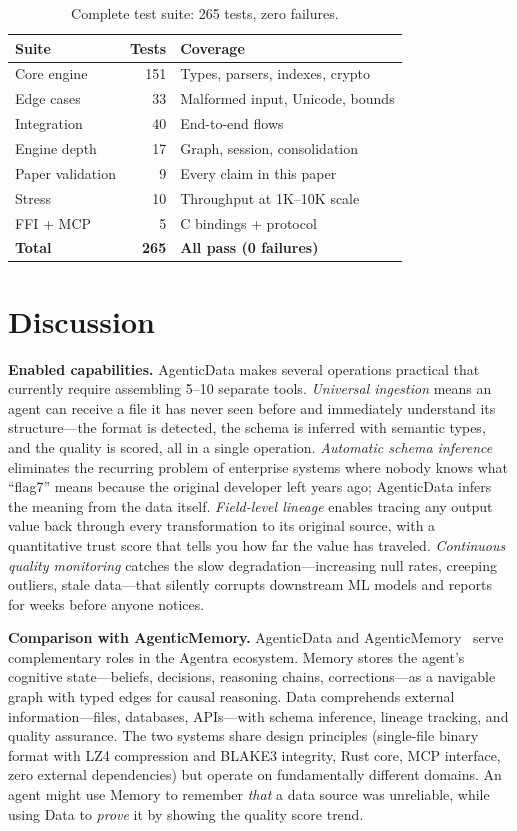 \documentclass[10pt, twocolumn]{article}
\begin{document}
\begin{table}[t]
\caption{Complete test suite: 265 tests, zero failures.}
\label{tab:tests}
\centering\scriptsize
\begin{tabular}{@{}lrl@{}}
\toprule
\textbf{Suite} & \textbf{Tests} & \textbf{Coverage} \\
\midrule
Core engine & 151 & Types, parsers, indexes, crypto \\
Edge cases & 33 & Malformed input, Unicode, bounds \\
Integration & 40 & End-to-end flows \\
Engine depth & 17 & Graph, session, consolidation \\
Paper validation & 9 & Every claim in this paper \\
Stress & 10 & Throughput at 1K--10K scale \\
FFI + MCP & 5 & C bindings + protocol \\
\midrule
\textbf{Total} & \textbf{265} & \textbf{All pass (0 failures)} \\
\bottomrule
\end{tabular}
\end{table}


\section{Discussion}\label{sec:discussion}

\textbf{Enabled capabilities.} AgenticData makes several operations practical that currently require assembling 5--10 separate tools. \emph{Universal ingestion} means an agent can receive a file it has never seen before and immediately understand its structure---the format is detected, the schema is inferred with semantic types, and the quality is scored, all in a single operation. \emph{Automatic schema inference} eliminates the recurring problem of enterprise systems where nobody knows what ``flag7'' means because the original developer left years ago; AgenticData infers the meaning from the data itself. \emph{Field-level lineage} enables tracing any output value back through every transformation to its original source, with a quantitative trust score that tells you how far the value has traveled. \emph{Continuous quality monitoring} catches the slow degradation---increasing null rates, creeping outliers, stale data---that silently corrupts downstream ML models and reports for weeks before anyone notices.

\textbf{Comparison with AgenticMemory.} AgenticData and AgenticMemory~\cite{owolabi2026agenticmemory} serve complementary roles in the Agentra ecosystem. Memory stores the agent's cognitive state---beliefs, decisions, reasoning chains, corrections---as a navigable graph with typed edges for causal reasoning. Data comprehends external information---files, databases, APIs---with schema inference, lineage tracking, and quality assurance. The two systems share design principles (single-file binary format with LZ4 compression and BLAKE3 integrity, Rust core, MCP interface, zero external dependencies) but operate on fundamentally different domains. An agent might use Memory to remember \emph{that} a data source was unreliable, while using Data to \emph{prove} it by showing the quality score trend.
\end{document}
